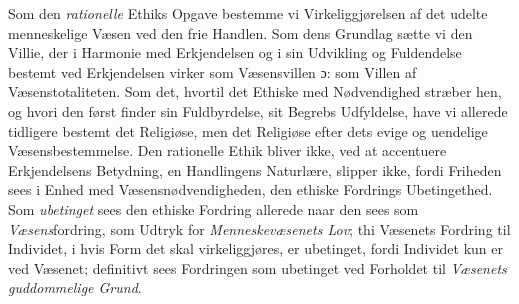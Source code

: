 \documentclass[12pt,a4paper]{book}
\begin{document}
Som den \emph{rationelle} Ethiks Opgave bestemme vi Virkeliggjørelsen af det udelte menneskelige
Væsen ved den frie Handlen. Som dens Grundlag sætte vi den Villie, der i Harmonie med
Erkjendelsen og i sin Udvikling og Fuldendelse bestemt ved Erkjendelsen virker som
Væsensvillen ɔ: som Villen af Væsenstotaliteten. Som det, hvortil det Ethiske med Nødvendighed
stræber hen, og hvori den først finder sin Fuldbyrdelse, sit Begrebs Udfyldelse, have vi
allerede tidligere bestemt det Religiøse, men det Religiøse efter dets evige og uendelige
Væsensbestemmelse. Den rationelle Ethik bliver ikke, ved at accentuere Erkjendelsens
Betydning, en Handlingens Naturlære, slipper ikke, fordi Friheden sees i Enhed med
Væsensnødvendigheden, den ethiske Fordrings Ubetingethed. Som \emph{ubetinget} sees den ethiske
Fordring allerede naar den sees som \emph{Væsens}fordring, som Udtryk for
\emph{Menneskevæsenets Lov}; thi Væsenets Fordring til Individet, i hvis Form det skal
virkeliggjøres, er ubetinget, fordi Individet kun er ved Væsenet; definitivt sees Fordringen
som ubetinget ved Forholdet til \emph{Væsenets guddommelige Grund}.
\end{document}
